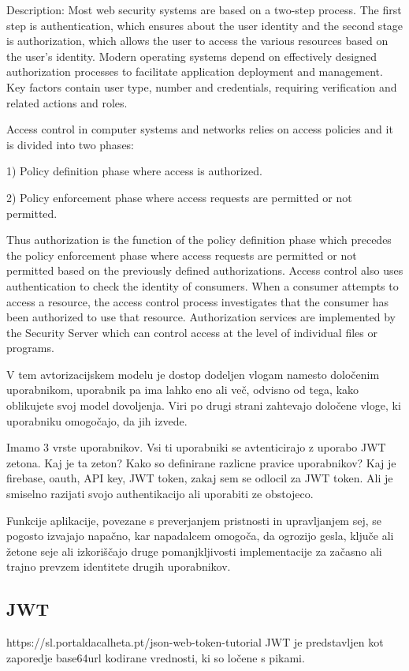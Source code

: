\documentclass[a4paper, 12pt]{book}
\begin{document}
Description: Most web security systems are based on a two-step process. The first step is authentication, which ensures about the user identity and the second stage is authorization, which allows the user to access the various resources based on the user's identity. Modern operating systems depend on effectively designed authorization processes to facilitate application deployment and management. Key factors contain user type, number and credentials, requiring verification and related actions and roles.

Access control in computer systems and networks relies on access policies and it is divided into two phases:

1) Policy definition phase where access is authorized.

2) Policy enforcement phase where access requests are permitted or not permitted.

Thus authorization is the function of the policy definition phase which precedes the policy enforcement phase where access requests are permitted or not permitted based on the previously defined authorizations. Access control also uses authentication to check the identity of consumers. When a consumer attempts to access a resource, the access control process investigates that the consumer has been authorized to use that resource. Authorization services are implemented by the Security Server which can control access at the level of individual files or programs.


V tem avtorizacijskem modelu je dostop dodeljen vlogam namesto določenim uporabnikom, uporabnik pa ima lahko eno ali več, odvisno od tega, kako oblikujete svoj model dovoljenja. Viri po drugi strani zahtevajo določene vloge, ki uporabniku omogočajo, da jih izvede.

Imamo 3 vrste uporabnikov. Vsi ti uporabniki se avtenticirajo z uporabo JWT zetona. 
Kaj je ta zeton? Kako so definirane razlicne pravice uporabnikov? 
Kaj je firebase, oauth, API key, JWT token, zakaj sem se odlocil za JWT token. 
Ali je smiselno razijati svojo authentikacijo ali uporabiti ze obstojeco.


Funkcije aplikacije, povezane s preverjanjem pristnosti in upravljanjem sej, se pogosto izvajajo napačno, kar napadalcem omogoča, da ogrozijo gesla, ključe ali žetone seje ali izkoriščajo druge pomanjkljivosti implementacije za začasno ali trajno prevzem identitete drugih uporabnikov.

\subsection{JWT}
https://sl.portaldacalheta.pt/json-web-token-tutorial
JWT je predstavljen kot zaporedje base64url kodirane vrednosti, ki so ločene s pikami.
\end{document}
